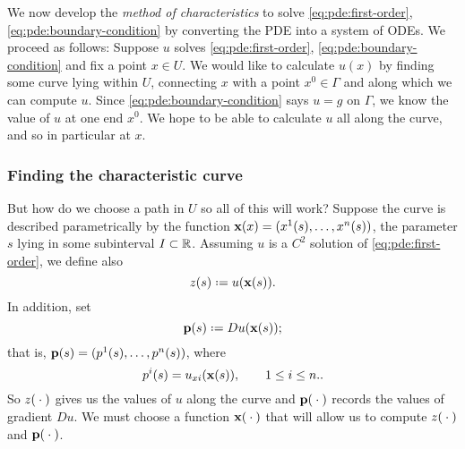 We now develop the \emph{method of characteristics} to solve
\eqref{eq:pde:first-order}, \eqref{eq:pde:boundary-condition} by converting
the PDE into a system of ODEs. We proceed as follows: Suppose \(u\) solves
\eqref{eq:pde:first-order}, \eqref{eq:pde:boundary-condition} and fix a
point \(x\in U\). We would like to calculate \(u(x)\) by finding some curve
lying within \(U\), connecting \(x\) with a point \(x^0\in\Gamma\) and
along which we can compute \(u\). Since \eqref{eq:pde:boundary-condition}
says \(u=g\) on \(\Gamma\), we know the value of \(u\) at one end
\(x^0\). We hope to be able to calculate \(u\) all along the curve, and so
in particular at \(x\).

\subsubsection{Finding the characteristic curve}

But how do we choose a path in \(U\) so all of this will work? Suppose the
curve is described parametrically by the function
\(\mathbf{x}(x)=(x^1(s),\dotsc,x^n(s))\), the parameter \(s\) lying in some
subinterval \(I\subset\mathbb{R}\). Assuming \(u\) is a \(C^2\) solution of
\eqref{eq:pde:first-order}, we define also
\begin{equation}
  \label{eq:pde:parametrized-sol}
  z(s)\defeq u(\bfx(s)).
\end{equation}
In addition, set
\begin{equation}
  \label{eq:pde:parametrized-grad}
  \bfp(s)\defeq Du(\bfx(s));
\end{equation}
that is, \(\mathbf{p}(s)=(p^1(s),\dotsc,p^n(s))\), where
\begin{equation}
  \label{eq:pde:parametrized-grad-comp}
  p^i(s)=u_{xi}(\mathbf{x}(s)),\qquad 1\leq i\leq n..
\end{equation}
So \(z({}\cdot{})\) gives us the values of \(u\) along the curve and
\(\mathbf{p}({}\cdot{})\) records the values of gradient \(Du\). We must choose a
function \(\mathbf{x}({}\cdot{})\) that will allow us to compute \(z({}\cdot{})\) and
\(\mathbf{p}({}\cdot{})\).


